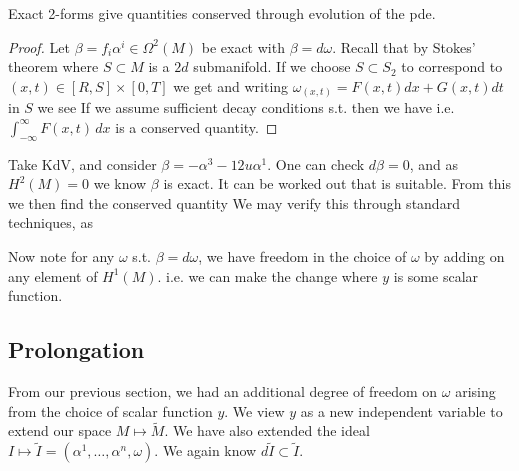 \documentclass{article}
\begin{document}
\begin{prop}
	Exact 2-forms give quantities conserved through evolution of the pde. 
\end{prop}
\begin{proof}
	Let $\beta = f_i \alpha^i \in \Omega^2(M)$ be exact with $\beta = d\omega$.  Recall that by Stokes' theorem 
where $S \subset M$ is a $2d$ submanifold. If we choose $S\subset S_2$ to correspond to $(x,t) \in [R,S] \times [0,T]$ we get 
and writing $\omega_{(x,t)} = F(x,t) dx + G(x,t) dt$ in $S$ we see 
If we assume sufficient decay conditions s.t. 
then we have 
i.e. $\int_{-\infty}^\infty F(x,t) \, dx$ is a conserved quantity. 
\end{proof}

\begin{example}
	Take KdV, and consider $\beta = -\alpha^3 - 12u\alpha^1$. One can check $d\beta = 0$, and as $H^2(M) = 0$ we know $\beta$ is exact. It can be worked out that 
is suitable. From this we then find the conserved quantity 
We may verify this through standard techniques, as 
\end{example}

Now note for any $\omega$ s.t. $\beta=d\omega$, we have freedom in the choice of $\omega$ by adding on any element of $H^1(M)$. i.e. we can make the change 
where $y$ is some scalar function. 
\subsection{Prolongation}
From our previous section, we had an additional degree of freedom on $\omega$ arising from the choice of scalar function $y$. We view $y$ as a new independent variable to extend our space  $M \mapsto \tilde{M} $. We have also extended the ideal $I\mapsto \tilde{I} = (\alpha^1, \dots, \alpha^n,\omega)$. We again know $d\tilde{I}\subset \tilde{I}$. 
\end{document}
